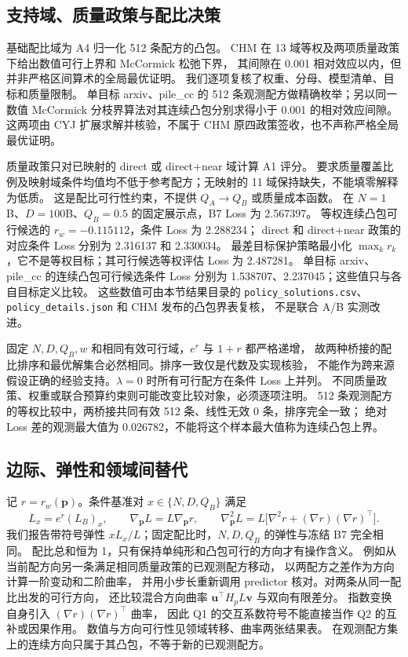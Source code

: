 \subsection{支持域、质量政策与配比决策}

基础配比域为 A4 归一化 512 条配方的凸包。
CHM 在 13 域等权及两项质量政策下给出数值可行上界和 McCormick 松弛下界，
其间隙在 0.001 相对效应以内，但并非严格区间算术的全局最优证明。
我们逐项复核了权重、分母、模型清单、目标和质量限制。
单目标 arxiv、pile\_cc 的 512 条观测配方做精确枚举；另以同一数值 McCormick 分枝界算法对其连续凸包分别求得小于 0.001 的相对效应间隙。
这两项由 CYJ 扩展求解并核验，不属于 CHM 原四政策签收，也不声称严格全局最优证明。

质量政策只对已映射的 direct 或 direct+near 域计算 A1 评分。
要求质量覆盖比例及映射域条件均值均不低于参考配方；无映射的 11 域保持缺失，不能填零解释为低质。
这是配比可行性约束，不提供 $Q_A\rightarrow Q_B$ 或质量成本函数。
在 $N=1$B、$D=100$B、$Q_B=0.5$ 的固定展示点，B7 Loss 为 2.567397。
等权连续凸包可行候选的 $r_w=-0.115112$，条件 Loss 为 2.288234；
direct 和 direct+near 政策的对应条件 Loss 分别为 2.316137 和 2.330034。
最差目标保护策略最小化 $\max_k r_k$，它不是等权目标；其可行候选等权评估 Loss 为 2.487281。
单目标 arxiv、pile\_cc 的连续凸包可行候选条件 Loss 分别为 1.538707、2.237045；这些值只与各自目标定义比较。
这些数值可由本节结果目录的 \texttt{policy\_solutions.csv}、
\texttt{policy\_details.json} 和 CHM 发布的凸包界表复核，
不是联合 A/B 实测改进。

固定 $N,D,Q_B,w$ 和相同有效可行域，$e^r$ 与 $1+r$ 都严格递增，
故两种桥接的配比排序和最优解集合必然相同。排序一致仅是代数及实现核验，
不能作为跨来源假设正确的经验支持。$\lambda=0$ 时所有可行配方在条件 Loss 上并列。
不同质量政策、权重或联合预算约束则可能改变比较对象，必须逐项注明。
512 条观测配方的等权比较中，两桥接共同有效 512 条、线性无效 0 条，排序完全一致；
绝对 Loss 差的观测最大值为 0.026782，不能将这个样本最大值称为连续凸包上界。

\subsection{边际、弹性和领域间替代}

记 $r=r_w(\boldsymbol p)$。条件基准对 $x\in\{N,D,Q_B\}$ 满足
\begin{equation}
L_x=e^r(L_B)_x,\qquad
\nabla_{\boldsymbol p}L=L\nabla_{\boldsymbol p}r,\qquad
\nabla^2_{\boldsymbol p}L=L\bigl[\nabla^2r+(\nabla r)(\nabla r)^\top\bigr].
\end{equation}
我们报告带符号弹性 $xL_x/L$；固定配比时，$N,D,Q_B$ 的弹性与冻结 B7 完全相同。
配比总和恒为 1，只有保持单纯形和凸包可行的方向才有操作含义。
例如从当前配方向另一条满足相同质量政策的已观测配方移动，
以两配方之差作为方向计算一阶变动和二阶曲率，
并用小步长重新调用 predictor 核对。对两条从同一配比出发的可行方向，
还比较混合方向曲率 $\boldsymbol u^\top H_pL\boldsymbol v$ 与双向有限差分。
指数变换自身引入 $(\nabla r)(\nabla r)^\top$ 曲率，
因此 Q1 的交互系数符号不能直接当作 Q2 的互补或因果作用。
数值与方向可行性见领域转移、曲率两张结果表。
在观测配方集上的连续方向只属于其凸包，不等于新的已观测配方。


